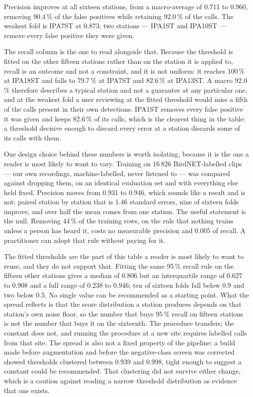 \documentclass[review,3p,times]{elsarticle}
\begin{document}
Precision improves at all sixteen stations, from a macro-average of 0.711 to
0.960, removing 90.4\,\% of the false positives while retaining 92.0\,\% of the
calls. The weakest fold is IPA7ST at 0.873; two stations --- IPA1ST and
IPA10ST --- remove every false positive they were given.

The recall column is the one to read alongside that. Because the threshold is
fitted on the other fifteen stations rather than on the station it is applied
to, recall is an outcome and not a constraint, and it is not uniform: it reaches
100\,\% at IPA18ST and falls to 79.7\,\% at IPA7ST and 82.6\,\% at IPA13ST. A
macro 92.0\,\% therefore describes a typical station and not a guarantee at any
particular one, and at the weakest fold a user reviewing at the fitted threshold
would miss a fifth of the calls present in their own detections.
IPA1ST removes every false positive it was given and keeps 82.6\,\% of its
calls, which is the clearest thing in the table: a threshold decisive enough
to discard every error at a station discards some of its calls with them.

One design choice behind these numbers is worth isolating, because it is the
one a reader is most likely to want to vary. Training on 16\,826 BirdNET-labelled
clips --- our own recordings, machine-labelled, never listened to --- was
compared against dropping them, on an identical evaluation set and with
everything else held fixed. Precision moves from 0.931 to 0.946, which sounds
like a result and is not: paired station by station that is 1.46 standard errors,
nine of sixteen folds improve, and over half the mean comes from one station.
The useful statement is the null. Removing 44\,\% of the training rows, on the
rule that nothing trains unless a person has heard it, costs no measurable
precision and 0.005 of recall. A practitioner can adopt that rule without paying
for it.

The fitted thresholds are the part of this table a reader is most likely to want
to reuse, and they do not support that. Fitting the same 95\,\% recall rule on
the fifteen other stations gives a median of 0.806 but an interquartile range of
0.627 to 0.908 and a full range of 0.238 to 0.946; ten of sixteen folds fall
below 0.9 and two below 0.5. No single value can be recommended as a starting
point. What the spread reflects is that the score distribution a station produces
depends on that station's own noise floor, so the number that buys 95\,\% recall
on fifteen stations is not the number that buys it on the sixteenth. The
procedure transfers; the constant does not, and running the procedure at a new
site requires labelled calls from that site. The spread is also not a fixed
property of the pipeline: a build made before augmentation and before the
negative-class screen was corrected showed thresholds clustered between 0.939
and 0.998, tight enough to suggest a constant could be recommended. That
clustering did not survive either change, which is a caution against reading a
narrow threshold distribution as evidence that one exists.
\end{document}

